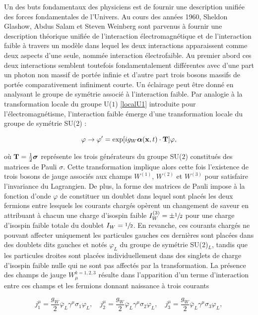     Un des buts fondamentaux des physiciens est de fournir une description unifiée des forces fondamentales de l'Univers. Au cours des années 1960, Sheldon Glashow, Abdus Salam et Steven Weinberg sont parvenus à fournir une description théorique unifiée de l'interaction électromagnétique et de l'interaction faible à travers un modèle dans lequel les deux interactions apparaissent comme deux aspects d'une seule, nommée interaction électrofaible. Au premier abord ces deux interactions semblent toutefois fondamentalement différentes avec d'une part un photon non massif de portée infinie et d'autre part trois bosons massifs de portée comparativement infiniment courte. Un éclairage peut être donné en analysant le groupe de symétrie associé à l'interaction faible. Par analogie à la transformation locale du groupe U($1$) \ref{localU1} introduite pour l'électromagnétisme, l'interaction faible émerge d'une transformation locale du groupe de symétrie SU($2$) :

    \begin{equation}
        \varphi\rightarrow\varphi'=\exp[ig_{W}\vb*{\alpha}(\vb{x},t)\cdot\vb{T}]\varphi,
    \label{localSU2}
    \end{equation}

    où $\vb{T}=\frac{1}{2}\vb*{\sigma}$ représente les trois générateurs du groupe SU($2$) constitués des matrices de Pauli $\sigma$. Cette transformation implique alors cette fois l'existence de trois bosons de jauge associés aux champs $W^{(1)}$, $W^{(2)}$ et $W^{(3)}$ pour satisfaire l'invariance du Lagrangien. De plus, la forme des matrices de Pauli impose à la fonction d'onde $\varphi$ de constituer un doublet dans lequel sont placés les deux fermions entre lesquels les courants chargés opèrent un changement de saveur en attribuant à chacun une charge d'isospin faible $I_W^{(3)}=\pm\sfrac{1}{2}$ pour une charge d'isospin faible totale du doublet $I_W=\sfrac{1}{2}$. En revanche, ces courants chargés ne pouvant affecter uniquement les particules gauches ces dernières sont placées dans des doublets dits gauches et notés $\varphi_L$ du groupe de symétrie SU($2$)$_L$, tandis que les particules droites sont placées individuellement dans des singlets de charge d'isospin faible nulle qui ne sont pas affectés par la transformation. La présence des champs de jauge $W_\mu^{k=1,2,3}$ résulte dans l'apparition d'un terme d'interaction entre ces champs et les fermions donnant naissance à trois courants

    \begin{equation*}
        j_1^{\mu}=\frac{g_W}{2}\overline{\varphi}_L\gamma^{\mu}\sigma_1\varphi_L, \quad
        j_2^{\mu}=\frac{g_W}{2}\overline{\varphi}_L\gamma^{\mu}\sigma_2\varphi_L, \quad
        j_3^{\mu}=\frac{g_W}{2}\overline{\varphi}_L\gamma^{\mu}\sigma_3\varphi_L,
    \end{equation*}

